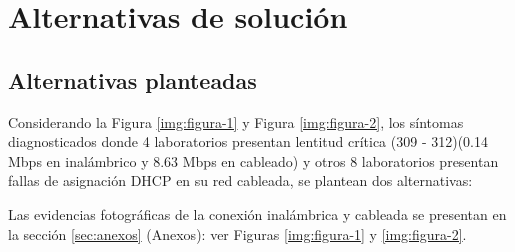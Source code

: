 \section{Alternativas de solución}

\subsection{Alternativas planteadas}

	Considerando la Figura \ref{img:figura-1} y Figura \ref{img:figura-2}, los síntomas diagnosticados donde 4 laboratorios presentan lentitud crítica (309 - 312)(0.14 Mbps en inalámbrico y 8.63 Mbps en cableado) y otros 8 laboratorios presentan fallas de asignación DHCP en su red cableada, se plantean dos alternativas:

	Las evidencias fotográficas de la conexión inalámbrica y cableada se presentan en la sección \ref{sec:anexos} (Anexos): ver Figuras \ref{img:figura-1} y \ref{img:figura-2}.

